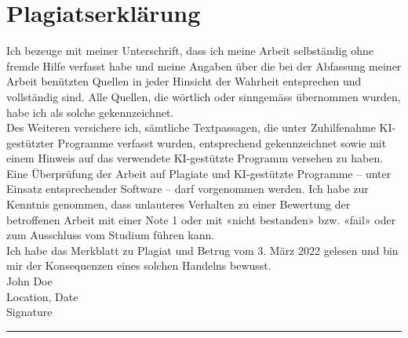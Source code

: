 \documentclass[12pt,a4paper,titlepage,oneside,english]{article}
\begin{document}
\section*{Plagiatserklärung}
Ich bezeuge mit meiner Unterschrift, dass ich meine Arbeit selbständig ohne fremde Hilfe verfasst habe
und meine Angaben über die bei der Abfassung meiner Arbeit benützten Quellen in jeder Hinsicht der
Wahrheit entsprechen und vollständig sind. Alle Quellen, die wörtlich oder sinngemäss übernommen
wurden, habe ich als solche gekennzeichnet. \\
Des Weiteren versichere ich, sämtliche Textpassagen, die unter Zuhilfenahme KI-gestützter
Programme verfasst wurden, entsprechend gekennzeichnet sowie mit einem Hinweis auf das
verwendete KI-gestützte Programm versehen zu haben. \\
Eine Überprüfung der Arbeit auf Plagiate und KI-gestützte Programme – unter Einsatz entsprechender
Software – darf vorgenommen werden. Ich habe zur Kenntnis genommen, dass unlauteres Verhalten zu
einer Bewertung der betroffenen Arbeit mit einer Note 1 oder mit «nicht bestanden» bzw. «fail» oder zum
Ausschluss vom Studium führen kann. \\
Ich habe das Merkblatt zu Plagiat und Betrug vom 3. März 2022 gelesen und bin mir der Konsequenzen
eines solchen Handelns bewusst. \\

John Doe \\
Location, Date \\
Signature
\hrule width 3cm \relax

\end{document}
